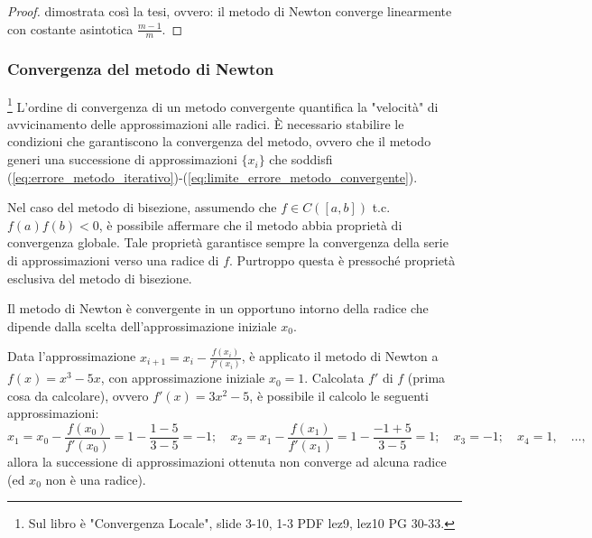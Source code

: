 \begin{proof}
	
	 dimostrata così la tesi, ovvero: il metodo di Newton converge linearmente con costante asintotica $\frac{m-1}{m}$.
\end{proof}

\subsubsection{Convergenza del metodo di Newton}\footnote{Sul libro è "Convergenza Locale", slide 3-10, 1-3 PDF lez9, lez10 PG 30-33.} 
L'ordine di convergenza di un metodo convergente quantifica la "velocità" di avvicinamento delle approssimazioni alle radici. È necessario stabilire le condizioni che garantiscono la convergenza del metodo, ovvero che il metodo generi una successione di approssimazioni $\{x_i\}$ che soddisfi (\ref{eq:errore_metodo_iterativo})-(\ref{eq:limite_errore_metodo_convergente}).

Nel caso del metodo di bisezione, assumendo che $f\in C([a,b])$ t.c. $f(a)f(b)<0$, è possibile affermare che il metodo abbia proprietà di convergenza globale. Tale proprietà garantisce sempre la convergenza della serie di approssimazioni verso una radice di $f$. Purtroppo questa è pressoché proprietà esclusiva del metodo di bisezione.

Il metodo di Newton è convergente in un opportuno intorno della radice che dipende dalla scelta dell'approssimazione iniziale $x_0$.
\begin{example} 
	Data l'approssimazione $x_{i+1}=x_i-\frac{f(x_i)}{f'(x_i)}$, è applicato il metodo di Newton a $f(x)=x^3-5x$, con approssimazione iniziale $x_0=1$. Calcolata $f'$ di $f$ (prima cosa da calcolare), ovvero $f'(x)=3x^2-5$, è possibile il calcolo le seguenti approssimazioni:
	\begin{equation*}
		x_1=x_0-\frac{f(x_0)}{f'(x_0)}=1-\frac{1-5}{3-5}=-1;\quad x_2=x_1-\frac{f(x_1)}{f'(x_1)}=1-\frac{-1+5}{3-5}=1;\quad x_3=-1;\quad x_4=1,\quad\hdots,
	\end{equation*}
	allora la successione di approssimazioni ottenuta non converge ad alcuna radice (ed $x_0$ non è una radice).
\end{example}

